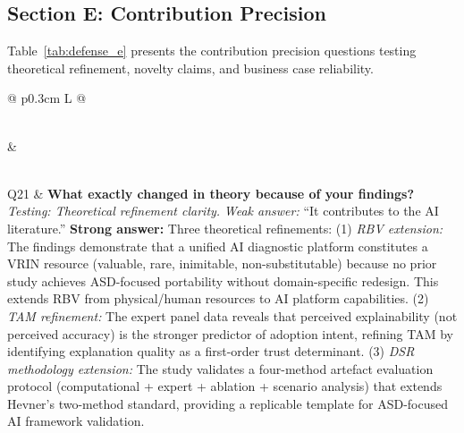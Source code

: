 \subsection{Section E: Contribution Precision}

\noindent Table~\ref{tab:defense_e} presents the contribution precision questions testing theoretical refinement, novelty claims, and business case reliability.

\tablefontsize
\begin{xltabular}
{\textwidth}{@{} p{0.3cm} L @{}}
\caption{Contribution Precision and Theoretical Refinement Questions} \label{tab:defense_e} \\
\toprule
\thead{\#} &  \\
\midrule
\endfirsthead
\endhead
\midrule
{} \\
\endfoot
\bottomrule
\endlastfoot

Q21 & \textbf{What exactly changed in theory because of your findings?} \newline
\textit{Testing: Theoretical refinement clarity.} \newline\newline
\textit{Weak answer:} ``It contributes to the AI literature.'' \newline\newline
\textbf{Strong answer:} Three theoretical refinements: (1) \textit{RBV extension:} The findings demonstrate that a unified AI diagnostic platform constitutes a VRIN resource (valuable, rare, inimitable, non-substitutable) because no prior study achieves ASD-focused portability without domain-specific redesign. This extends RBV from physical/human resources to AI platform capabilities. (2) \textit{TAM refinement:} The expert panel data reveals that perceived explainability (not perceived accuracy) is the stronger predictor of adoption intent, refining TAM by identifying explanation quality as a first-order trust determinant. (3) \textit{DSR methodology extension:} The study validates a four-method artefact evaluation protocol (computational + expert + ablation + scenario analysis) that extends Hevner's two-method standard, providing a replicable template for ASD-focused AI framework validation. \\
\addlinespace


\end{xltabular}
